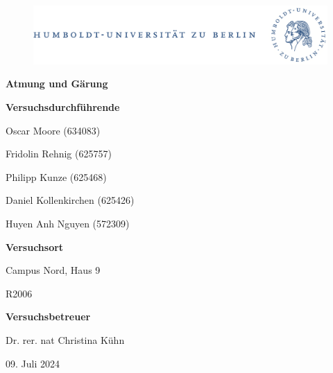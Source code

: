 \documentclass[10pt,a4paper]{article}
\begin{document}
	
	\begin{titlepage}
		\begin{center}
			\begin{figure}[h!tbp]
				\includegraphics[width=\linewidth]{HUlogo.PNG}
			\end{figure}
			\vspace*{2 cm}
			
			\textcolor{Bluetitle}{\textbf{\huge Atmung und Gärung}}\par
			
			\vspace*{2cm}
			
			\textcolor{Greyish}{\textbf{Versuchsdurchführende}}\par
			\textcolor{Greyish}{Oscar Moore (634083)}\par
			\textcolor{Greyish}{Fridolin Rehnig (625757)}\par
			\textcolor{Greyish}{Philipp Kunze (625468)}\par
			\textcolor{Greyish}{Daniel Kollenkirchen (625426)}\par
			\textcolor{Greyish}{Huyen Anh Nguyen (572309)}\par
			
			\vspace*{0.5cm}
			\textcolor{Greyish}{\textbf{Versuchsort}}\par
			\textcolor{Greyish}{Campus Nord, Haus 9}\par
			\textcolor{Greyish}{R2006}\par
			\vspace*{0.5cm}
			\textcolor{Greyish}{\textbf{Versuchsbetreuer}}\par
			\textcolor{Greyish}{Dr. rer. nat Christina Kühn}\par
			
			\vspace*{2 cm}
			
			\textcolor{Greyish}{09. Juli 2024}\par
			
			
			
			
		\end{center}
	\end{titlepage}
	
	\tableofcontents
	
\end{document}
